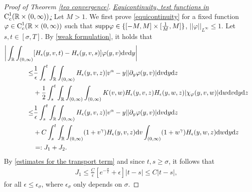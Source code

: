 \documentclass[11pt]{article}
\numberwithin{equation}{section}
\newcommand{\supp}{\textup{supp}}
\newcommand{\der}{\textup{d}}
\begin{document}
\begin{proof}[Proof of Theorem \ref{teo convergence}]
\textit{\underline{Equicontinuity, test functions in $\textup{C}^{1}_{c}(\mathbb{R}\times(0,\infty))$:}} Let $M>1$. We first prove \eqref{equicontinuity} for a fixed function $\varphi\in\textup{C}^{1}_{c}(\mathbb{R}\times(0,\infty)) $ such that $\supp\varphi\in\{[-M,M]\times [\frac{1}{M},M]\}$, $||\varphi||_{L^{\infty}}\leq 1$. Let $s,t\in [\sigma,T]$. By \eqref{weak formulation}, it holds that
\begin{align*}
\bigg|\int_{\mathbb{R}}\int_{(0,\infty)} &[H_{\epsilon}(y,v,t)-H_{\epsilon}(y,v,s)]\varphi(y,v)\der v \der y\bigg|\\
\leq &\frac{1}{\epsilon}\int_{s}^{t}\int_{\mathbb{R}}\int_{(0,\infty)} H_{\epsilon}(y,v,z)|v^{\alpha}-y||\partial_{y}\varphi(y,v)|\der v \der y\der z\\
&+\frac{1}{2}\int_{s}^{t}\int_{\mathbb{R}}\int_{(0,\infty)}\int_{(0,\infty)}K(v,w)H_{\epsilon}(y,v,z)H_{\epsilon}(y,w,z)|\chi_{\varphi}(y,v,w)|\der w\der v \der y\der z\\
\leq &\frac{1}{\epsilon}\int_{s}^{t}\int_{\mathbb{R}}\int_{(0,\infty)} H_{\epsilon}(y,v,z)|v^{\alpha}-y||\partial_{y}\varphi(y,v)|\der v \der y\der z\\
&+C\int_{s}^{t}\int_{\mathbb{R}}\int_{(0,\infty)}(1+v^{\gamma})H_{\epsilon}(y,v,z)\der v\int_{(0,\infty)}(1+w^{\gamma})H_{\epsilon}(y,w,z)\der w \der y\der z\\
&=: J_{1}+J_{2}.
\end{align*}
By \eqref{estimates for the transport term} and since $t,s\geq \sigma$, it follows that
\begin{align}\label{j1 j1}
    J_{1}\leq \frac{C}{\epsilon}[e^{-\frac{\sigma}{\epsilon}}+\epsilon]|t-s|\leq C|t-s|,
\end{align}
for all $\epsilon\leq \epsilon_{\sigma}$, where $\epsilon_{\sigma}$ only depends on $\sigma$. 

\end{proof}
\end{document}
